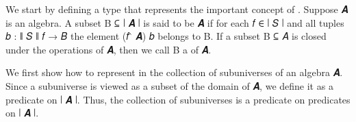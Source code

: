 We start by defining a type that represents the important concept of . Suppose \ab 𝑨 is an algebra. A subset \ab B \af ⊆ \af ∣ \ab 𝑨 \af ∣ is said to be  \ab 𝑨 if for each \ab 𝑓 ∈ \af ∣ \ab 𝑆 \af ∣ and all tuples \ab 𝑏 \as : \af ∥ \ab 𝑆 \af ∥ \ab 𝑓 \as → \ab 𝐵 the element (\ab 𝑓 \af ̂ \ab 𝑨) \ab 𝑏 belongs to \ab B. If a subset \ab B \af ⊆ \ab 𝐴 is closed under the operations of \ab 𝑨, then we call \ab B a  of \ab 𝑨.

We first show how to represent in \agda the collection of subuniverses of an algebra \ab 𝑨.  Since a subuniverse is viewed as a subset of the domain of \ab 𝑨, we define it as a predicate on \af ∣ \ab 𝑨 \af ∣.  Thus, the collection of subuniverses is a predicate on predicates on \af ∣ \ab 𝑨 \af ∣.
\ccpad
\begin{code}%
\>[1]\AgdaSpace{}%
\AgdaSymbol{:}\AgdaSpace{}%
\AgdaSymbol{(}\AgdaSpace{}%
\AgdaSymbol{:}\AgdaSpace{}%
\AgdaSpace{}%
\AgdaSpace{}%
\AgdaSymbol{)}\AgdaSpace{}%
\AgdaSpace{}%
\AgdaSpace{}%
\AgdaSymbol{(}\AgdaSpace{}%
\AgdaSpace{}%
\AgdaSpace{}%
\AgdaSpace{}%
\AgdaSymbol{)(}\AgdaSpace{}%
\AgdaSpace{}%
\AgdaSpace{}%
\AgdaSpace{}%
\AgdaSpace{}%
\AgdaSpace{}%
\AgdaSymbol{)}\<%
\\
%
\>[1]\AgdaSpace{}%
\AgdaSpace{}%
\AgdaSpace{}%
\AgdaSymbol{=}\AgdaSpace{}%
\AgdaSymbol{(}\AgdaSpace{}%
\AgdaSymbol{:}\AgdaSpace{}%
\AgdaSpace{}%
\AgdaSpace{}%
\AgdaSymbol{)(}\AgdaSpace{}%
\AgdaSymbol{:}\AgdaSpace{}%
\AgdaSpace{}%
\AgdaSpace{}%
\AgdaSpace{}%
\AgdaSpace{}%
\AgdaSpace{}%
\AgdaSpace{}%
\AgdaSpace{}%
\AgdaSymbol{)}\AgdaSpace{}%
\AgdaSpace{}%
\AgdaSpace{}%
\AgdaSpace{}%
\AgdaSpace{}%
\AgdaSpace{}%
\AgdaSpace{}%
\AgdaSymbol{(}\AgdaSpace{}%
\AgdaSpace{}%
\AgdaSymbol{)}\AgdaSpace{}%
\AgdaSpace{}%
\AgdaSpace{}%
\<%
\end{code}
